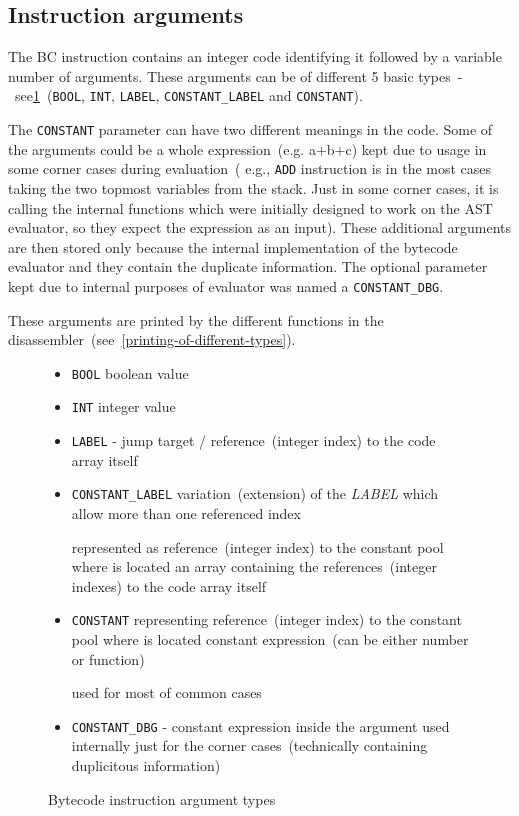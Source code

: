 \documentclass[thesis=M,english]{FITthesis}[2018/10/20]
\newcommand{\code}[1]{\texttt{#1}}
\begin{document}

\subsection{Instruction arguments}\label{instruction-arguments}
The BC instruction contains an integer code identifying it followed by a variable number of arguments. These arguments can be of different 5 basic types~-~see\ref{fig:bytecode-argument-types}~(\code{BOOL}, \code{INT}, \code{LABEL}, \code{CONSTANT{\_}LABEL} and \code{CONSTANT}).

The \code{CONSTANT} parameter can have two different meanings in the code. Some of the arguments could be a whole expression~(e.g. a+b+c) kept due to usage in some corner cases during evaluation~( e.g., \code{ADD} instruction is in the most cases taking the two topmost variables from the stack. Just in some corner cases, it is calling the internal functions which were initially designed to work on the AST evaluator, so they expect the expression as an input). These additional arguments are then stored only because the internal implementation of the bytecode evaluator and they contain the duplicate information. The optional parameter kept due to internal purposes of evaluator was named a \code{CONSTANT{\_}DBG}.

These arguments are printed by the different functions in the disassembler~(see~\ref{printing-of-different-types}).

\begin{figure}[H]
\begin{itemize}
	\item \code{BOOL} boolean value

	\item \code{INT} integer value

	\item \code{LABEL} - jump target / reference~(integer index) to the code array itself

	\item \code{CONSTANT{\_}LABEL} variation~(extension) of the \textit{LABEL} which allow more than one referenced index

	represented as reference~(integer index) to the constant pool where is located an array containing the references~(integer indexes) to the code array itself

	\item \code{CONSTANT} representing reference~(integer index) to the constant pool where is located constant expression~(can be either number or function)

	used for most of common cases

	\item \code{CONSTANT{\_}DBG} - constant expression inside the argument used internally just for the corner cases~(technically containing duplicitous information)
\end{itemize}
	\caption{Bytecode instruction argument types}\label{fig:bytecode-argument-types}
\end{figure}
\end{document}
